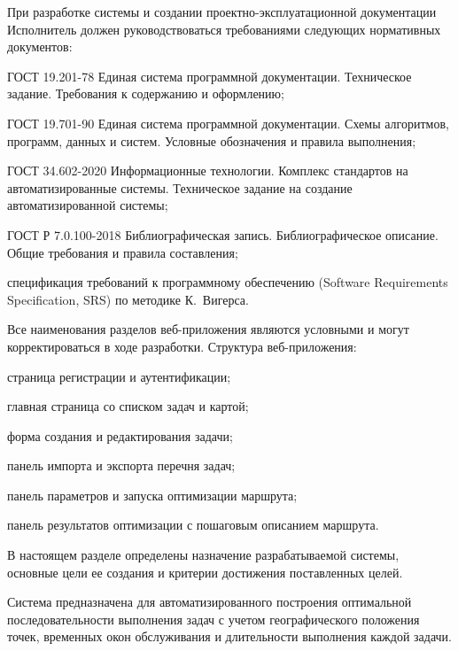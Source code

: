 При разработке системы и создании проектно-эксплуатационной документации Исполнитель
должен руководствоваться требованиями следующих нормативных документов:
\begin{compactlist}
  \item ГОСТ 19.201-78 Единая система программной документации. Техническое задание. Требования к содержанию и оформлению;
  \item ГОСТ 19.701-90 Единая система программной документации. Схемы алгоритмов, программ, данных и систем. Условные обозначения и правила выполнения;
  \item ГОСТ 34.602-2020 Информационные технологии. Комплекс стандартов на автоматизированные системы. Техническое задание на создание автоматизированной системы;
  \item ГОСТ Р 7.0.100-2018 Библиографическая запись. Библиографическое описание. Общие требования и правила составления;
  \item спецификация требований к программному обеспечению (Software Requirements Specification, SRS) по методике К.~Вигерса.
\end{compactlist}

Все наименования разделов веб-приложения являются условными и могут корректироваться
в ходе разработки. Структура веб-приложения:
\begin{compactlist}
  \item страница регистрации и аутентификации;
  \item главная страница со списком задач и картой;
  \item форма создания и редактирования задачи;
  \item панель импорта и экспорта перечня задач;
  \item панель параметров и запуска оптимизации маршрута;
  \item панель результатов оптимизации с пошаговым описанием маршрута.
\end{compactlist}

В настоящем разделе определены назначение разрабатываемой системы, основные цели ее
создания и критерии достижения поставленных целей.

Система предназначена для автоматизированного построения оптимальной последовательности
выполнения задач с учетом географического положения точек, временных окон обслуживания
и длительности выполнения каждой задачи.

